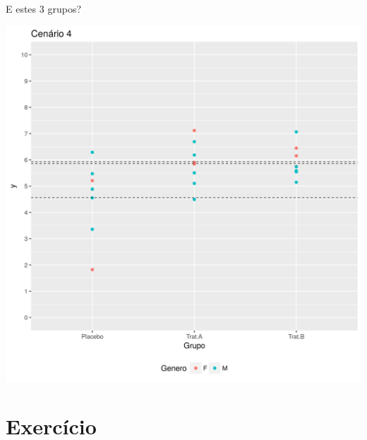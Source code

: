\documentclass{beamer}
\begin{document}
\begin{frame}{E estes 3 grupos?}
  \begin{center}
    \includegraphics[height=.9\textheight]{Cap13-30/cenario22_medias}

  \end{center}
\end{frame}

\section{Exercício}
\end{document}
